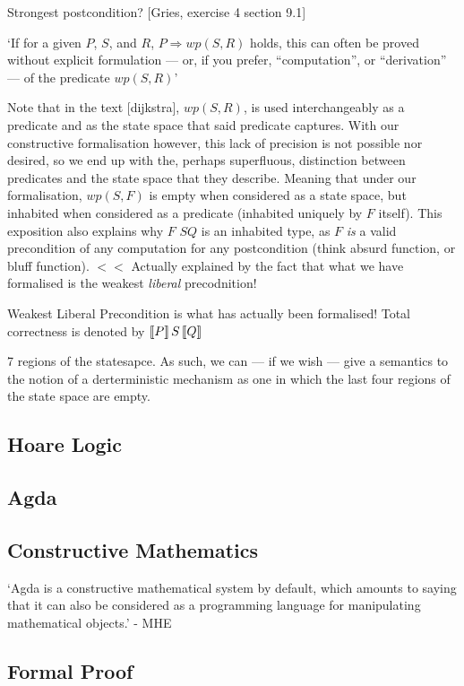 \documentclass[oneside,12pt]{article}
\newcommand{\pctrip}[3]{\large{\guillemotleft}\normalsize{$#1$}\large{\guillemotright}%
  \normalsize{$#2$}\large{\guillemotleft}\normalsize{$#3$}\large{\guillemotright}\normalsize}
\newcommand{\tctrip}[3]{$\large{\llbracket}\normalsize{#1}\large{\rrbracket}\,%
  \normalsize{#2}\,\large{\llbracket}\normalsize{#3}\large{\rrbracket}\normalsize$}
\begin{document}
Strongest postcondition?
[Gries, exercise 4 section 9.1]


`If for a given $P$, $S$, and $R$, $P \Rightarrow wp(S,R)$ holds, this can often be proved without explicit formulation --- or, if you prefer, ``computation'', or ``derivation'' --- of the predicate $wp(S,R)$'




Note that in the text [dijkstra], $wp(S,R)$, is used interchangeably as a predicate and as the state space that said predicate captures. With our constructive formalisation however, this lack of precision is not possible nor desired, so we end up with the, perhaps superfluous, distinction between predicates and the state space that they describe. Meaning that under our formalisation, $wp(S,F)$ is empty when considered as a state space, but inhabited when considered as a predicate (inhabited uniquely by $F$ itself). This exposition also explains why \pctrip{F}{S}{Q} is an inhabited type, as $F$ \emph{is} a valid precondition of any computation for any postcondition (think absurd function, or bluff function). $<<$ Actually explained by the fact that what we have formalised is the weakest \emph{liberal} precodnition!


Weakest Liberal Precondition is what has actually been formalised! Total correctness is denoted by \tctrip{P}{S}{Q}


7 regions of the statesapce. As such, we can --- if we wish --- give a semantics to the notion of a derterministic mechanism as one in which the last four regions of the state space are empty.

\subsection{Hoare Logic}


\subsection{Agda}

\subsection{Constructive Mathematics}

`Agda is a constructive mathematical system by default, which amounts to saying that it can also be considered as a
programming language for manipulating mathematical objects.' - MHE


\subsection{Formal Proof}
\end{document}
